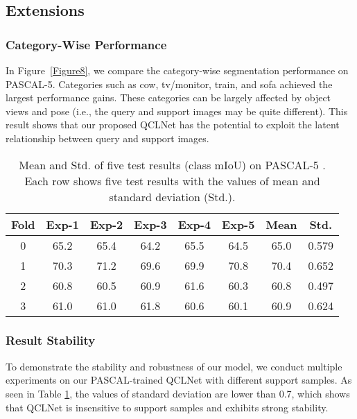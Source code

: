 \documentclass[lettersize,journal]{IEEEtran}
\begin{document}
\subsection{Extensions}
\subsubsection{Category-Wise Performance}

In Figure~\ref{Figure8}, we compare the category-wise segmentation performance on PASCAL-5. Categories such as cow, tv/monitor, train, and sofa achieved the largest performance gains. These categories can be largely affected by object views and pose (i.e., the query and support images may be quite different). This result shows that our proposed QCLNet has the potential to exploit the latent relationship between query and support images.

\begin{table}
\centering
\caption{Mean and Std. of five test results (class mIoU) on PASCAL-5 . Each row shows five test results with the values of mean and standard deviation (Std.).}
\label{tab10}
\begin{tabular}{c|ccccc|cc} 
\hline
Fold & Exp-1                              & Exp-2                              & Exp-3                              & Exp-4                              & Exp-5                              & Mean                               & Std.                                 \\ 
\hline
0    & {65.2} & {65.4} &{64.2} & {65.5} & {64.5} & {65.0} & {0.579}  \\
1    & {70.3} & {71.2} & {69.6} & {69.9} & {70.8} & {70.4} & {0.652}  \\
2    & {60.8} & {60.5} & {60.9} & {61.6} & {60.3} & {60.8} & {0.497}  \\
3    & {61.0} & {61.0} & {61.8} & {60.6} & {60.1} & {60.9} & {0.624}  \\
\hline
\end{tabular}
\end{table}

\subsubsection{Result Stability}
To demonstrate the stability and robustness of our model, we conduct multiple experiments on our PASCAL-trained QCLNet with different support samples. As seen in Table \ref{tab10}, the values of standard deviation are lower than 0.7, which shows that QCLNet is insensitive to support samples and exhibits strong stability.
\end{document}
